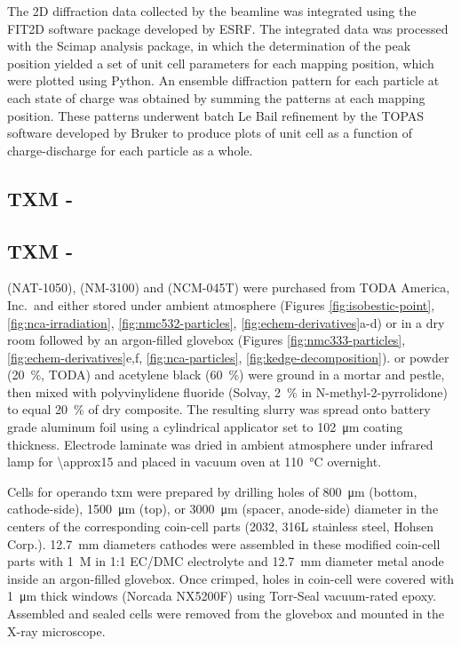 \documentclass{article}
\begin{document}
The 2D diffraction data collected by the beamline was integrated using
the FIT2D software package developed by
ESRF\cite{hausermann1996,hammersley1997}. The integrated data was
processed with the Scimap analysis package\cite{scimap}, in which the
determination of the peak position yielded a set of unit cell
parameters for each mapping position, which were plotted using
Python. An ensemble diffraction pattern for each particle at each
state of charge was obtained by summing the patterns at each mapping
position. These patterns underwent batch Le Bail refinement by the
TOPAS software developed by Bruker to produce plots of unit cell as a
function of charge-discharge for each particle as a whole.

\subsection{TXM - \nca{}}




\subsection{TXM - \nmc{}}

\nca{} (NAT-1050), \nmc[333]{} (NM-3100) and \nmc[532]{} (NCM-045T)
were purchased from TODA America, Inc.\ and either stored under
ambient atmosphere (Figures \ref{fig:isobestic-point},
\ref{fig:nca-irradiation}, \ref{fig:nmc532-particles},
\ref{fig:echem-derivatives}a-d) or in a dry room followed by an
argon-filled glovebox (Figures \ref{fig:nmc333-particles},
\ref{fig:echem-derivatives}e,f, \ref{fig:nca-particles},
\ref{fig:kedge-decomposition}). \nca{} or \nmc{} powder
(\SI{20}{\percent}, TODA) and acetylene black (\SI{60}{\percent}) were
ground in a mortar and pestle, then mixed with polyvinylidene fluoride
(Solvay, \SI{2}{\percent} in N-methyl-2-pyrrolidone) to equal
\SI{20}{\percent} of dry composite. The resulting slurry was spread
onto battery grade aluminum foil using a cylindrical applicator set to
\SI{102}{\micro\meter} coating thickness. Electrode laminate was dried
in ambient atmosphere under infrared lamp for \SI{\approx15}{\min} and
placed in vacuum oven at \SI{110}{\celsius} overnight.

Cells for operando \gls{txm} were prepared by drilling holes of
\SI{800}{\micro\meter} (bottom, cathode-side), \SI{1500}{\micro\meter}
(top), or \SI{3000}{\micro\meter} (spacer, anode-side) diameter in the
centers of the corresponding coin-cell parts (2032, 316L stainless
steel, Hohsen Corp.). \SI{12.7}{\milli\meter} diameters cathodes were
assembled in these modified coin-cell parts with \SI{1}{M} 
in 1:1 EC/DMC electrolyte and \SI{12.7}{\milli\meter} diameter 
metal anode inside an argon-filled glovebox. Once crimped, holes in
coin-cell were covered with \SI{1}{\micro\meter} thick 
windows (Norcada NX5200F) using Torr-Seal vacuum-rated
epoxy. Assembled and sealed cells were removed from the glovebox and
mounted in the X-ray microscope.
\end{document}
